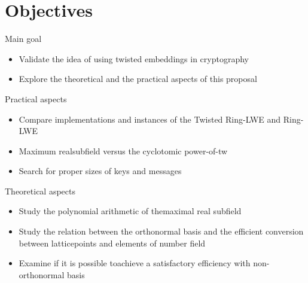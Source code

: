 \documentclass[notheorems, bigger]{beamer}
\begin{document}
\section{Objectives}
\label{sec:orgd0d812e}
\begin{frame}[label={sec:orgc6f0adf}]{Main goal}
\begin{itemize}
\item Validate the idea of using twisted embeddings in cryptography
\item Explore the theoretical and the practical aspects of this proposal
\end{itemize}
\end{frame}
\begin{frame}[label={sec:orgd408bfc}]{Practical aspects}
\begin{itemize}
\item Compare implementations and instances of the Twisted Ring-LWE and Ring-LWE
\item Maximum realsubfield versus the cyclotomic power-of-tw
\item Search for proper sizes of keys and messages
\end{itemize}
\end{frame}
\begin{frame}[label={sec:orgb3762a5}]{Theoretical aspects}
\begin{itemize}
\item Study the polynomial arithmetic of themaximal real subfield
\item Study the relation between the orthonormal basis and the efficient conversion between latticepoints and elements of number field
\item Examine if it is possible toachieve a satisfactory efficiency with non-orthonormal basis
\end{itemize}
\end{frame}
\end{document}
